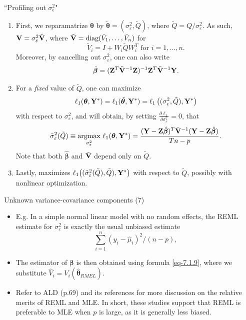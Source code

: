 \documentclass{beamer}
\newcommand{\boldbeta}{{\boldsymbol \beta}}
\newcommand{\boldtheta}{{\boldsymbol \theta}}
\newcommand{\boldZ}{{\bf Z}}
\newcommand{\boldV}{{\bf V}}
\newenvironment{wideitemize}%
  {\begin{itemize}%
    \setlength{\parskip}{1em}}%
  {\end{itemize}}
\begin{document}
\begin{frame}{``Profiling out  $\sigma_\epsilon^2$"}

\begin{enumerate}
\item First, we reparamatrize $\boldtheta$ by $\tilde{\boldtheta} = (\sigma_\varepsilon^2, \tilde{Q})$, where $
\tilde{Q} = Q/\sigma_\varepsilon^2$. As such, ${\bf V} = \sigma_\varepsilon^2 \tilde{\bf V}$, where $\tilde{\bf V}  = \text{diag} (\tilde{V}_1, \dots, \tilde{V}_n) $ for
\[
\tilde{V}_i= I+W_i\tilde{Q}W_i^T \text{ for } i  = 1, \dots, n.
\]
Moreover, by cancelling out $\sigma_\varepsilon^2$, one can also write
\[
\hat{\boldbeta} = {(\boldZ^T \tilde{\boldV}^{-1}\boldZ)^{-1} \boldZ^T \tilde{\boldV}^{-1} }{\bf Y}.
\]

\item For a \emph{fixed}  value of $\tilde{Q}$, one can maximize 
\[
\ell_1(\boldtheta, {\bf Y}^*) = \ell_1(\tilde{\boldtheta}, {\bf Y}^*) = \ell_1\left((\sigma_\epsilon^2, \tilde{Q}), {\bf Y}^*\right)
\]
 with respect to $\sigma_\varepsilon^2$, and will obtain, by setting $\frac{\partial \ell_1}{\partial \sigma_\varepsilon^2} = 0$, that
\[
\tilde{\sigma}^2_\varepsilon(\tilde{Q}) \equiv  \underset{\sigma_\varepsilon^2}{\text{argmax}} \ \ell_1(\boldtheta, {\bf Y}^*)= \frac{({\bf Y} - {\bf Z} \hat{\boldbeta} )^T  \tilde{\bf V}^{-1} ({\bf Y} - {\bf Z} \hat{\boldbeta})}{Tn - p}.
\] 
Note that both $\hat{\boldbeta}$ and $\tilde{\bf V}$ depend only on  $\tilde{Q}$.
\item Lastly, maximizes $\ell_1 \big((\tilde{\sigma}^2_\varepsilon(\tilde{Q}), \tilde{Q}), {\bf Y}^*\big)$ with respect to $\tilde{Q}$, possibly with nonlinear optimization.
\end{enumerate}
\end{frame}

\begin{frame}{Unknown variance-covariance components (7)}
\begin{wideitemize}



\item E.g. In a simple normal linear model with no random effects, the REML estimate for $\sigma_\varepsilon^2$ is exactly the usual unbiased estimate
\[
\sum_{i = 1}^n (y_i - \hat{\mu}_i)^2 /(n-p),
\]

\item The estimator of $\boldbeta$ is then obtained using formula \eqref{eq-7.1.9}, where we substitute $\hat{V}_i = V_i(\hat{\boldsymbol \theta}_{RMEL})$.


\item  Refer to ALD (p.69) and its references  for more discussion on the relative merits of REML and MLE. In short, these studies support that REML is preferable to MLE when $p$ is large, as it is generally less biased. 

\end{wideitemize}
\end{frame}
\end{document}
